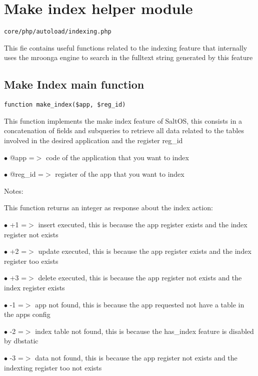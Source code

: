 \documentclass[a4paper]{book}
\begin{document}
\hypertarget{toc175}{}
\section{Make index helper module}

\begin{lstlisting}
core/php/autoload/indexing.php
\end{lstlisting}

This fie contains useful functions related to the indexing feature that internally uses the
mroonga engine to search in the fulltext string generated by this feature

\hypertarget{toc176}{}
\subsection{Make Index main function}

\begin{lstlisting}
function make_index($app, $reg_id)
\end{lstlisting}

This function implements the make index feature of SaltOS, this consists
in a concatenation of fields and subqueries to retrieve all data related to
the tables involved in the desired application and the register reg\_id

\begin{compactitem}
\item[\color{myblue}$\bullet$] @app    =$>$ code of the application that you want to index
\item[\color{myblue}$\bullet$] @reg\_id =$>$ register of the app that you want to index
\end{compactitem}

Notes:

This function returns an integer as response about the index action:

\begin{compactitem}
\item[\color{myblue}$\bullet$] +1 =$>$ insert executed, this is because the app register exists and the index register not exists
\item[\color{myblue}$\bullet$] +2 =$>$ update executed, this is because the app register exists and the index register too exists
\item[\color{myblue}$\bullet$] +3 =$>$ delete executed, this is because the app register not exists and the index register exists
\item[\color{myblue}$\bullet$] -1 =$>$ app not found, this is because the app requested not have a table in the apps config
\item[\color{myblue}$\bullet$] -2 =$>$ index table not found, this is because the has\_index feature is disabled by dbstatic
\item[\color{myblue}$\bullet$] -3 =$>$ data not found, this is because the app register not exists and the indexting register too not exists
\end{compactitem}
\end{document}
